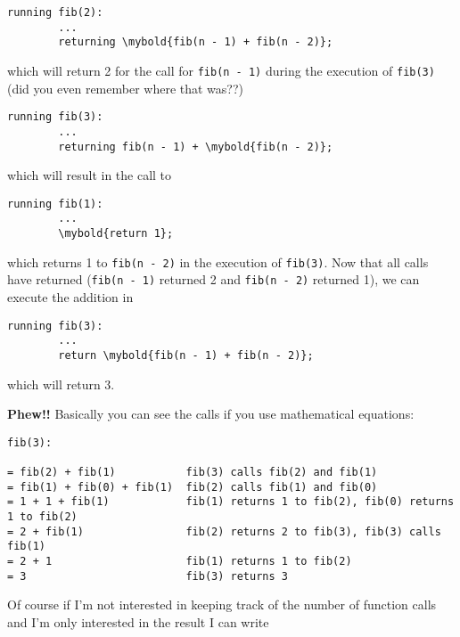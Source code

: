 \begin{Verbatim}[frame=single, commandchars=\\\{\}]
    running fib(2):
        ... 
        returning \mybold{fib(n - 1) + fib(n - 2)};
      \end{Verbatim}
      
which will return 2 for the call for \verb!fib(n - 1)! during the execution of \verb!fib(3)! (did
you even remember where that was??)

\begin{Verbatim}[frame=single, commandchars=\\\{\}]
     running fib(3):
        ...
        returning fib(n - 1) + \mybold{fib(n - 2)};
\end{Verbatim}

which will result in the call to

\begin{Verbatim}[frame=single, commandchars=\\\{\}]
    running fib(1):
        ...
        \mybold{return 1};
\end{Verbatim}

which returns 1 to \verb!fib(n - 2)! in the execution of \verb!fib(3)!. Now that all calls have
returned (\verb!fib(n - 1)! returned 2 and \verb!fib(n - 2)! returned 1), we can execute the addition in

\begin{Verbatim}[frame=single, commandchars=\\\{\}]
    running fib(3):
        ...
        return \mybold{fib(n - 1) + fib(n - 2)};
\end{Verbatim}

which will return 3.


\textbf{Phew!!} Basically you can see the calls if you use mathematical equations:
{\small
\begin{Verbatim}
fib(3):
  
= fib(2) + fib(1)           fib(3) calls fib(2) and fib(1)
= fib(1) + fib(0) + fib(1)  fib(2) calls fib(1) and fib(0)
= 1 + 1 + fib(1)            fib(1) returns 1 to fib(2), fib(0) returns 1 to fib(2)
= 2 + fib(1)                fib(2) returns 2 to fib(3), fib(3) calls fib(1)
= 2 + 1                     fib(1) returns 1 to fib(2)
= 3                         fib(3) returns 3
      \end{Verbatim}
      }



\newpage
Of course if I'm not interested in keeping track of the number of function
calls and I'm only interested in
the result I can write

